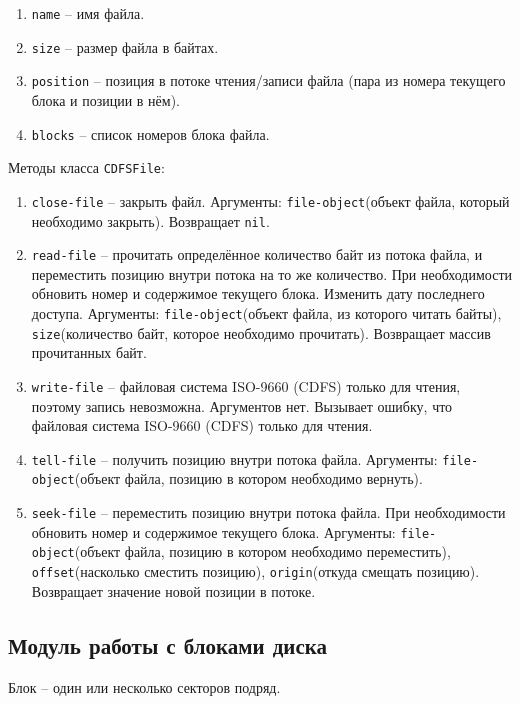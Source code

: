 \begin{enumerate}
	\begin{enumerate}
	\item \texttt{name} -- имя файла.
	\item \texttt{size} -- размер файла в байтах.
	\item \texttt{position} -- позиция в потоке чтения/записи файла (пара из номера текущего блока и позиции в нём).
	\item \texttt{blocks} -- список номеров блока файла.
	\end{enumerate}

Методы класса \texttt{CDFSFile}:

	\begin{enumerate}
	\item \texttt{close-file} -- закрыть файл. Аргументы: \texttt{file-object}(объект файла, который необходимо закрыть). Возвращает \texttt{nil}.
	\item \texttt{read-file} -- прочитать определённое количество байт из потока файла, и переместить позицию внутри потока на то же количество. При необходимости обновить номер и содержимое текущего блока. Изменить дату последнего доступа. Аргументы: \texttt{file-object}(объект файла, из которого читать байты), \texttt{size}(количество байт, которое необходимо прочитать). Возвращает массив прочитанных байт.
	\item \texttt{write-file} -- файловая система ISO-9660 (CDFS) только для чтения, поэтому запись невозможна. Аргументов нет. Вызывает ошибку, что файловая система ISO-9660 (CDFS) только для чтения.
	\item \texttt{tell-file} -- получить позицию внутри потока файла. Аргументы: \texttt{file-object}(объект файла, позицию в котором необходимо вернуть).
	\item \texttt{seek-file} -- переместить позицию внутри потока файла. При необходимости обновить номер и содержимое текущего блока. Аргументы: \texttt{file-object}(объект файла, позицию в котором необходимо переместить), \texttt{offset}(насколько сместить позицию), \texttt{origin}(откуда смещать позицию). Возвращает значение новой позиции в потоке.
	\end{enumerate}

\end{enumerate}

\subsection{Модуль работы с блоками диска}

Блок -- один или несколько секторов подряд.

